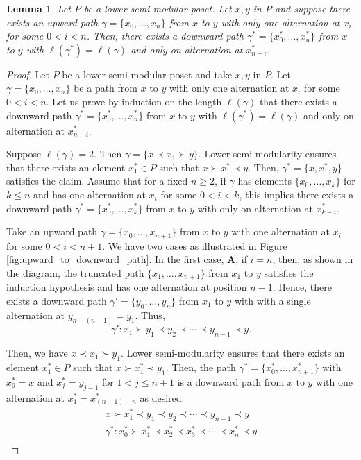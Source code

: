 \documentclass{article}[12pt]
\theoremstyle{exampstyle}
\newtheorem{lemma}[theorem]{Lemma}
\theoremstyle{remark}
\newcommand{\tuple}[3][1]{#2_{#1}, \dots , #2_{#3}}
\begin{document}
\begin{lemma}
    Let $P$ be a lower semi-modular poset. Let $x,y$ in $P$ and suppose there exists an upward path $\gamma = \{\tuple[0]{x}{n}\}$ from $x$ to $y$ with only one alternation at $x_i$ for some $0 <i < n$. Then, there exists a downward path $\gamma^*= \{\tuple[0]{x^*}{n}\}$ from  $x$ to $y$ with $\ell(\gamma^*) = \ell(\gamma)$ and only on alternation at $x^*_{n-i}$. 
    \label{lemma:upward_to_downward_path}
 \end{lemma}
\begin{proof}
    Let $P$ be a lower semi-modular poset and take $x,y$ in $P$. Let $\gamma = \{\tuple[0]{x}{n}\}$ be a path from $x$ to $y$ with only one alternation at $x_i$ for some $0 <i < n$. Let us prove by induction on the length $\ell(\gamma)$ that there exists a downward path $\gamma^*= \{\tuple[0]{x^*}{n}\}$ from  $x$ to $y$ with $\ell(\gamma^*) = \ell(\gamma)$ and only on alternation at $x^*_{n-i}$. 
    
    Suppose $\ell(\gamma) = 2$. Then $\gamma = \{ x \prec x_1 \succ y\}$. Lower semi-modularity ensures that  there exists an element $x_1^* \in P$ such that $x \succ x^*_1 \prec y$. Then, $\gamma^*= \{ x, x^*_1, y \}$ satisfies the claim. Assume that for a fixed $n \geq 2$, if $\gamma$ has elements  $\{\tuple[0]{x}{k}\}$ for $k \leq n$ and has one alternation at $x_i$ for some $0 < i < k$, this implies there exists a downward path $\gamma^*= \{\tuple[0]{x^*}{k}\}$ from $x$ to $y$ with only on alternation at $x^*_{k-i}$.

    Take an upward path $\gamma = \{\tuple[0]{x}{n+1}\} $ from $x$ to $y$ with one alternation at $x_i$ for some $0 < i < n+1$. We have two cases as illustrated in Figure \ref{fig:upward_to_downward_path}. In the first case, \textbf{A},  if $i = n$, then, as shown in the  diagram, the truncated path $\{\tuple[1]{x}{n+1}\}$ from $x_1$ to $y$ satisfies the induction hypothesis and has one alternation at position $n-1$. Hence, there exists a downward path \mbox{$\gamma' = \{\tuple[0]{y}{n}\}$} from $x_1$ to $y$ with with a single alternation at  $y_{n - (n-1) } = y_1$. Thus, 
    \[ \gamma': x_1 \succ y_1 \prec y_{2} \prec \cdots \prec y_{n-1} \prec y.\]

    Then, we have $x \prec x_1 \succ y_1$. Lower semi-modularity ensures that there exists an element $x^*_1 \in P$ such that $x \succ x^*_1 \prec y_1$. Then, the path $\gamma^*= \{\tuple[0]{x^*}{n+1}\}$ with  $x^*_0 = x$ and $x^*_{j} = y_{j-1}$ for $ 1 < j \leq n+1$ is a downward path from $x$ to $y$ with one alternation at $x^*_1 = x^{*}_{(n+1) - n}$ as desired.
    \begin{align*}
         x \succ x^*_1 \prec y_1 \prec y_{2} \prec \cdots \prec y_{n-1} \prec y \\
       \gamma^*:  x^*_0  \succ x^*_1 \prec x^*_2 \prec x^*_3 \prec \cdots \prec x^*_n \prec y \\
    \end{align*}


\end{proof}
\end{document}
